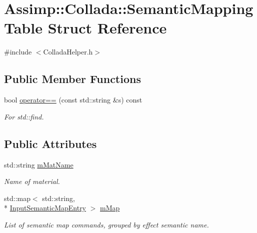\hypertarget{struct_assimp_1_1_collada_1_1_semantic_mapping_table}{\section{Assimp\+:\+:Collada\+:\+:Semantic\+Mapping\+Table Struct Reference}
\label{struct_assimp_1_1_collada_1_1_semantic_mapping_table}
}


{\ttfamily \#include $<$Collada\+Helper.\+h$>$}

\subsection*{Public Member Functions}
\begin{DoxyCompactItemize}
\item 
\hypertarget{struct_assimp_1_1_collada_1_1_semantic_mapping_table_ae606ea292d0947f32639db8233774b7d}{bool \hyperlink{struct_assimp_1_1_collada_1_1_semantic_mapping_table_ae606ea292d0947f32639db8233774b7d}{operator==} (const std\+::string \&s) const }\label{struct_assimp_1_1_collada_1_1_semantic_mapping_table_ae606ea292d0947f32639db8233774b7d}

\begin{DoxyCompactList}\small\item\em For std\+::find. \end{DoxyCompactList}\end{DoxyCompactItemize}
\subsection*{Public Attributes}
\begin{DoxyCompactItemize}
\item 
\hypertarget{struct_assimp_1_1_collada_1_1_semantic_mapping_table_a7158e5110d4ca92c0b4422806649443d}{std\+::string \hyperlink{struct_assimp_1_1_collada_1_1_semantic_mapping_table_a7158e5110d4ca92c0b4422806649443d}{m\+Mat\+Name}}\label{struct_assimp_1_1_collada_1_1_semantic_mapping_table_a7158e5110d4ca92c0b4422806649443d}

\begin{DoxyCompactList}\small\item\em Name of material. \end{DoxyCompactList}\item 
\hypertarget{struct_assimp_1_1_collada_1_1_semantic_mapping_table_a2eb236c722827f2357a1480e7656a69f}{std\+::map$<$ std\+::string, \\*
\hyperlink{struct_assimp_1_1_collada_1_1_input_semantic_map_entry}{Input\+Semantic\+Map\+Entry} $>$ \hyperlink{struct_assimp_1_1_collada_1_1_semantic_mapping_table_a2eb236c722827f2357a1480e7656a69f}{m\+Map}}\label{struct_assimp_1_1_collada_1_1_semantic_mapping_table_a2eb236c722827f2357a1480e7656a69f}

\begin{DoxyCompactList}\small\item\em List of semantic map commands, grouped by effect semantic name. \end{DoxyCompactList}\end{DoxyCompactItemize}


